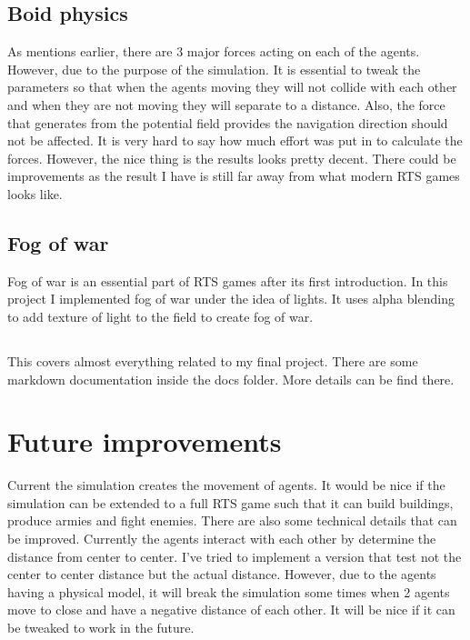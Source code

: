 \documentclass[letterpaper, 12pt]{article}
\begin{document}
\subsection*{Boid physics}
As mentions earlier, there are 3 major forces acting on each of the agents. However, due to the purpose of the simulation. It is essential to tweak the parameters so that when the agents moving they will not collide with each other and when they are not moving they will separate to a distance. Also, the force that generates from the potential field provides the navigation direction should not be affected. It is very hard to say how much effort was put in to calculate the forces. However, the nice thing is the results looks pretty decent. There could be improvements as the result I have is still far away from what modern RTS games looks like.


\subsection*{Fog of war}
Fog of war is an essential part of RTS games after its first introduction. In this project I implemented fog of war under the idea of lights. It uses alpha blending to add texture of light to the field to create fog of war. 

\subsection*{}
This covers almost everything related to my final project. There are some markdown documentation inside the docs folder. More details can be find there. 

\section*{Future improvements}
Current the simulation creates the movement of agents. It would be nice if the simulation can be extended to a full RTS game such that it can build buildings, produce armies and fight enemies. There are also some technical details that can be improved. Currently the agents interact with each other by determine the distance from center to center. I've tried to implement a version that test not the center to center distance but the actual distance. However, due to the agents having a physical model, it will break the simulation some times when 2 agents move to close and have a negative distance of each other. It will be nice if it can be tweaked to work in the future. 
\end{document}
